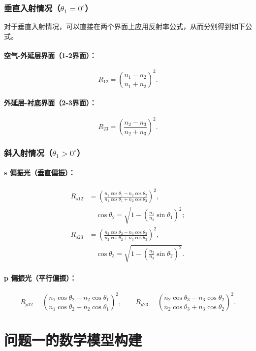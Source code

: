 \documentclass{ctexart} %
\begin{document}
\subsubsection{垂直入射情况（\(\theta_1 = 0^\circ\)）}
对于垂直入射情况，可以直接在两个界面上应用反射率公式，从而分别得到如下公式。
\paragraph{空气-外延层界面（1-2界面）：}
\[
    R_{12} = \left( \frac{n_1 - n_2}{n_1 + n_2} \right)^2.
\]
\paragraph{外延层-衬底界面（2-3界面）：}
\[
    R_{23} = \left( \frac{n_2 - n_3}{n_2 + n_3} \right)^2.
\]

\subsubsection{斜入射情况（\(\theta_1 > 0^\circ\)）}
\paragraph{s 偏振光（垂直偏振）：}
\begin{align*}
    R_{s12} & = \left( \frac{n_1 \cos\theta_1 - n_2 \cos\theta_2}{n_1 \cos\theta_1 + n_2 \cos\theta_2} \right)^2, \\
            & \quad \cos\theta_2 = \sqrt{1 - \left( \frac{n_1}{n_2} \sin\theta_1 \right)^2};                      \\[4pt]
    R_{s23} & = \left( \frac{n_2 \cos\theta_2 - n_3 \cos\theta_3}{n_2 \cos\theta_2 + n_3 \cos\theta_3} \right)^2, \\
            & \quad \cos\theta_3 = \sqrt{1 - \left( \frac{n_2}{n_3} \sin\theta_2 \right)^2}.
\end{align*}

\paragraph{p 偏振光（平行偏振）：}
\[
    R_{p12} = \left( \frac{n_1 \cos\theta_2 - n_2 \cos\theta_1}{n_1 \cos\theta_2 + n_2 \cos\theta_1} \right)^2,\qquad
    R_{p23} = \left( \frac{n_2 \cos\theta_3 - n_3 \cos\theta_2}{n_2 \cos\theta_3 + n_3 \cos\theta_2} \right)^2.
\]

\section{问题一的数学模型构建}
\end{document}
